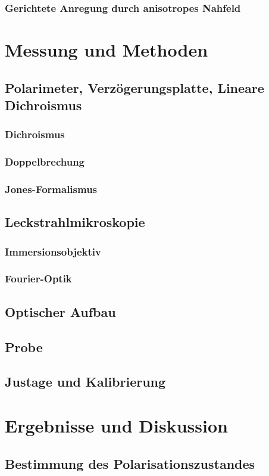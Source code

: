 \documentclass{article}
\begin{document}
	\subsubsection{Gerichtete Anregung durch anisotropes Nahfeld}	
\section{Messung und Methoden}
\subsection{Polarimeter, Verzögerungsplatte, Lineare Dichroismus}
	\subsubsection{Dichroismus}
	\subsubsection{Doppelbrechung}
	\subsubsection{Jones-Formalismus}
\subsection{Leckstrahlmikroskopie}
	\subsubsection{Immersionsobjektiv}
	\subsubsection{Fourier-Optik}
\subsection{Optischer Aufbau}
\subsection{Probe}
\subsection{Justage und Kalibrierung}
\section{Ergebnisse und Diskussion}
	\subsection{Bestimmung des Polarisationszustandes}
\end{document}
